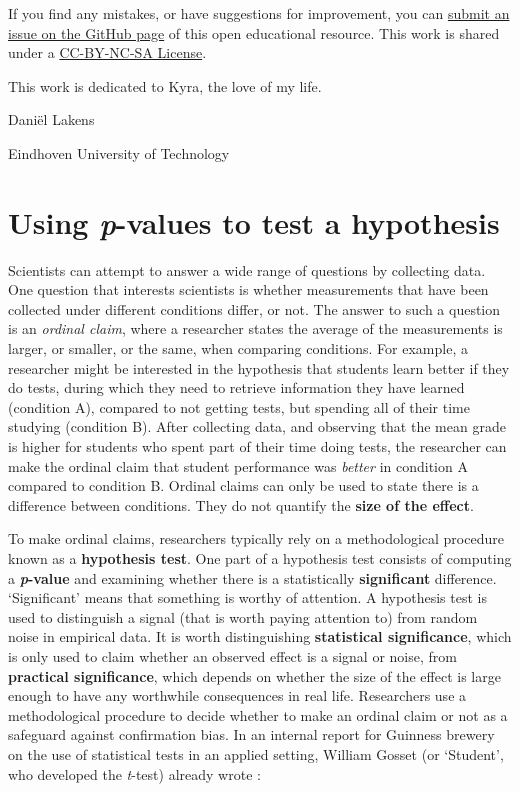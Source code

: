 \documentclass[
  oneside]{krantz}
\begin{document}
If you find any mistakes, or have suggestions for improvement, you can \href{https://github.com/Lakens/statistical_inferences/issues}{submit an issue on the GitHub page} of this open educational resource. This work is shared under a \href{https://creativecommons.org/licenses/by-nc-sa/4.0}{CC-BY-NC-SA License}.

This work is dedicated to Kyra, the love of my life.

Daniël Lakens

Eindhoven University of Technology

\mainmatter

\hypertarget{pvalue}{%
\chapter{\texorpdfstring{Using \emph{p}-values to test a hypothesis}{Using p-values to test a hypothesis}}\label{pvalue}}

Scientists can attempt to answer a wide range of questions by collecting data. One question that interests scientists is whether measurements that have been collected under different conditions differ, or not. The answer to such a question is an \emph{ordinal claim}, where a researcher states the average of the measurements is larger, or smaller, or the same, when comparing conditions. For example, a researcher might be interested in the hypothesis that students learn better if they do tests, during which they need to retrieve information they have learned (condition A), compared to not getting tests, but spending all of their time studying (condition B). After collecting data, and observing that the mean grade is higher for students who spent part of their time doing tests, the researcher can make the ordinal claim that student performance was \emph{better} in condition A compared to condition B. Ordinal claims can only be used to state there is a difference between conditions. They do not quantify the \textbf{size of the effect}.

To make ordinal claims, researchers typically rely on a methodological procedure known as a \textbf{hypothesis test}. One part of a hypothesis test consists of computing a \textbf{\emph{p}-value} and examining whether there is a statistically \textbf{significant} difference. `Significant' means that something is worthy of attention. A hypothesis test is used to distinguish a signal (that is worth paying attention to) from random noise in empirical data. It is worth distinguishing \textbf{statistical significance}, which is only used to claim whether an observed effect is a signal or noise, from \textbf{practical significance}, which depends on whether the size of the effect is large enough to have any worthwhile consequences in real life. Researchers use a methodological procedure to decide whether to make an ordinal claim or not as a safeguard against confirmation bias. In an internal report for Guinness brewery on the use of statistical tests in an applied setting, William Gosset (or `Student', who developed the \emph{t}-test) already wrote \citeyearpar{gosset_application_1904}:
\end{document}
